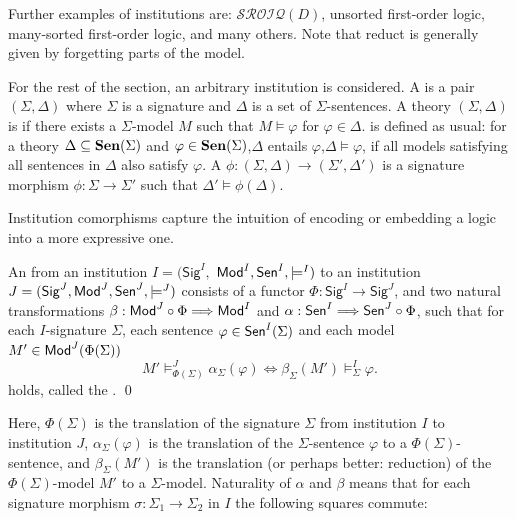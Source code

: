 \documentclass[10pt,fleqn,final]{scrreprt}
\newcommand{\cbs}[0]{\color{red}\xspace} %
\newcommand{\cbe}[0]{\color{black}\xspace} %
\newcommand{\Sig}{\mathsf{Sig}}
\newenvironment{definitions}[0]{\medskip }{}
\begin{document}
\begin{definitions}
Further examples of institutions are: $\mathcal{SROIQ}(D)$, unsorted first-order logic, 
many-sorted first-order logic, and many others.  Note that reduct is generally given by forgetting 
parts of the model.

For the rest of the section,\cbs an arbitrary institution is considered. \cbe
A  is a pair $(\Sigma,\Delta)$ where $\Sigma$ is a signature and $\Delta$ is a set of $\Sigma$-sentences.
 A theory $(\Sigma, \Delta)$ is  if there exists a $\Sigma$-model $M$ such that
$M\models\varphi$ for $\varphi \in \Delta$.  is defined as usual: 
for  a theory $\Delta\subseteq \mathbf {Sen}(\Sigma)$ and 
$\varphi\in \mathbf {Sen}(\Sigma)$,\cbs $\Delta$ entails $\varphi$,\cbe $\Delta\models\varphi$, if all models satisfying all sentences in
$\Delta$ also satisfy $\varphi$. A  $\phi: (\Sigma, \Delta) \rightarrow (\Sigma',  \Delta')$ is 
   a signature morphism $\phi:\Sigma\rightarrow \Sigma'$ such that $\Delta'\models \phi(\Delta)$.

\medskip

Institution comorphisms capture the intuition of encoding or embedding a logic into a more expressive one.

\begin{definition} An  from an institution $I = (\Sig^I,$ $ \mathsf{Mod}^I, \mathsf{Sen}^I, \models^I)$ to an institution $J=(\Sig^J, \Mod^J,\Sen^J, \models^J)$ consists of a functor $\Phi : \Sig^I \longrightarrow \Sig^J$, and
two natural transformations $\beta: \mathsf{Mod}^J \circ \Phi \Longrightarrow \mathsf{Mod}^I$
and $\alpha: \mathsf{Sen}^I \Longrightarrow \mathsf{Sen}^J \circ \Phi$, such that 
for each $I$-signature $\Sigma$, each sentence $\varphi\in\mathsf{Sen}^I(\Sigma)$ and each model $M'\in\mathsf{Mod}^J(\Phi(\Sigma))$
$$ M'\models^{J}_{\Phi(\Sigma)}\alpha_{\Sigma}(\varphi) \Leftrightarrow
\beta_{\Sigma}(M')\models^I_{\Sigma}\varphi.
$$
holds, called the .
\qed\end{definition}

\noindent
Here, $\Phi(\Sigma)$ is the translation of the signature $\Sigma$ from
institution $I$ to institution $J$, $\alpha_{\Sigma}(\varphi)$ is the
translation of the $\Sigma$-sentence $\varphi$ to a
$\Phi(\Sigma)$-sentence, and $\beta_{\Sigma}(M')$ is the translation
(or perhaps better: reduction) of the $\Phi(\Sigma)$-model $M'$ to a
$\Sigma$-model. Naturality of $\alpha$ and $\beta$ means that for each
signature morphism $\sigma:\Sigma_1\rightarrow\Sigma_2$ in $I$ the following 
squares commute:


\end{definitions}
\end{document}
